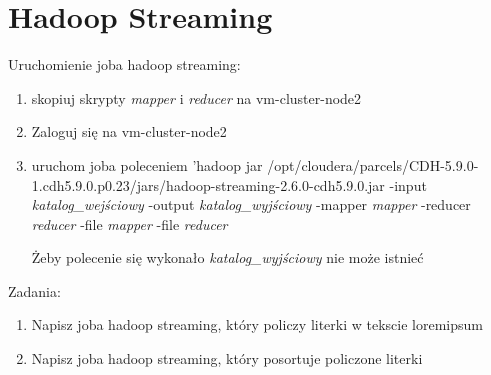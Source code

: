 \documentclass[11pt]{article}
\begin{document}
\section*{Hadoop Streaming}

Uruchomienie joba hadoop streaming:
\begin{enumerate}
\item skopiuj skrypty \textit{mapper} i \textit{reducer} na vm-cluster-node2
\item Zaloguj się na vm-cluster-node2
\item uruchom joba poleceniem 'hadoop jar /opt/cloudera/parcels/CDH-5.9.0-1.cdh5.9.0.p0.23/jars/hadoop-streaming-2.6.0-cdh5.9.0.jar -input \textit{katalog\_wejściowy} -output \textit{katalog\_wyjściowy} -mapper \textit{mapper} -reducer \textit{reducer} -file \textit{mapper} -file \textit{reducer}

Żeby polecenie się wykonało \textit{katalog\_wyjściowy} nie może istnieć
\end{enumerate}

Zadania:
\begin{enumerate}
\item Napisz joba hadoop streaming, który policzy literki w tekscie loremipsum
\item Napisz joba hadoop streaming, który posortuje policzone literki
\end{enumerate}
\end{document}
